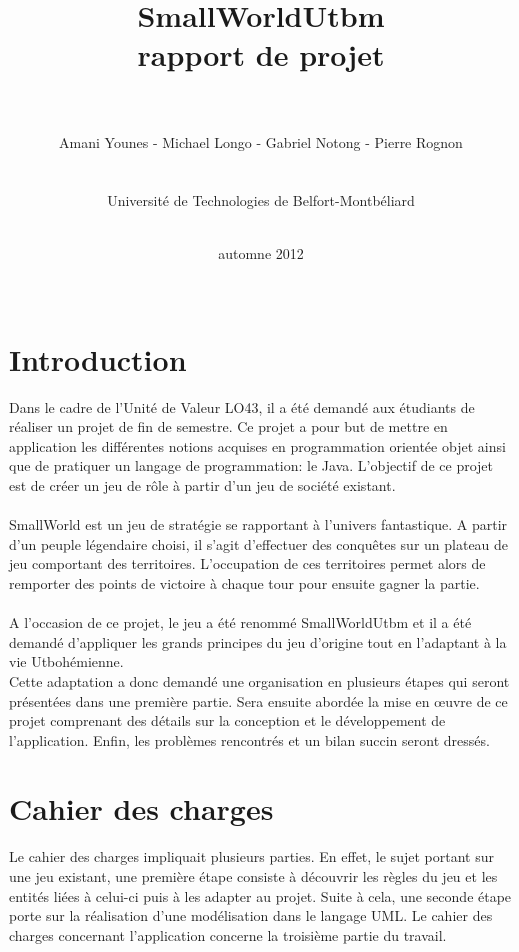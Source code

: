 \documentclass[a4paper, 11pt]{article}
\title{\vspace{5cm}SmallWorldUtbm \\ rapport de projet \\ \ \\}
\date{automne 2012\\ \ \\}
\author{Amani Younes - Michael Longo - Gabriel Notong - Pierre Rognon \\ \ \\ \ \\ Université de Technologies de Belfort-Montbéliard\\ \ \\}
\begin{document}
	
	\maketitle
	
	\newpage
	
	\tableofcontents
	
	\newpage
	
	\section*{Introduction}
	
	Dans le cadre de l'Unité de Valeur LO43, il a été demandé aux étudiants de réaliser un projet de fin de semestre. Ce projet a pour but de mettre en application les différentes notions acquises en programmation orientée objet ainsi que de pratiquer un langage de programmation: le Java. L'objectif de ce projet est de créer un jeu de rôle à partir d'un jeu de société existant.
	\paragraph{} SmallWorld est un jeu de stratégie se rapportant à l'univers fantastique. A partir d'un peuple légendaire choisi, il s'agit d'effectuer des conquêtes sur un plateau de jeu comportant des territoires. L'occupation de ces territoires permet alors de remporter des points de victoire à chaque tour pour ensuite gagner la partie. 
	\paragraph{}A l'occasion de ce projet, le jeu a été renommé SmallWorldUtbm et il a été demandé d'appliquer les grands principes du jeu d'origine tout en l'adaptant à la vie Utbohémienne. \\
	Cette adaptation a donc demandé une organisation en plusieurs étapes qui seront présentées dans une première partie. Sera ensuite abordée la mise en œuvre de ce projet comprenant des détails sur la conception et le développement de l'application. Enfin, les problèmes rencontrés et un bilan succin seront dressés.
	
	
	\newpage
	
	\section{Cahier des charges}
	
	Le cahier des charges impliquait plusieurs parties. En effet, le sujet portant sur une jeu existant, une première étape consiste à découvrir les règles du jeu et les entités liées à celui-ci puis à les adapter au projet. Suite à cela, une seconde étape porte sur la réalisation d'une modélisation dans le langage UML. Le cahier des charges concernant l'application concerne la troisième partie du travail.
	
\end{document}
